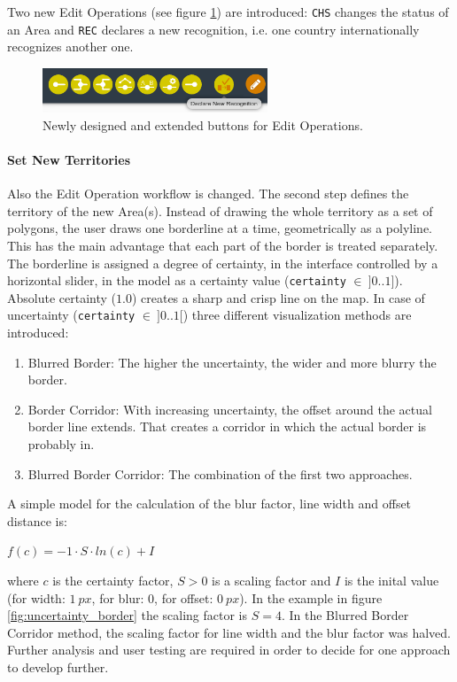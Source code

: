 Two new Edit Operations (see figure \ref{fig:edit_mode_extension}) are introduced: \texttt{CHS} changes the status of an Area and \texttt{REC} declares a new recognition, i.e. one country internationally recognizes another one.

\begin{figure}[ht]
  \centering
  \includegraphics[width = 0.6\textwidth]{graphics/extensions/edit_mode_extension.png}
  \caption{Newly designed and extended buttons for Edit Operations.}
  \label{fig:edit_mode_extension}
\end{figure}

\paragraph{Set New Territories} %
\label{par:set_new_territory}

Also the Edit Operation workflow is changed. The second step defines the territory of the new Area(s). Instead of drawing the whole territory as a set of polygons, the user draws one borderline at a time, geometrically as a polyline. This has the main advantage that each part of the border is treated separately. The borderline is assigned a degree of certainty, in the interface controlled by a horizontal slider, in the model as a certainty value (\texttt{certainty} $\in~]0 .. 1]$). Absolute certainty ($1.0$) creates a sharp and crisp line on the map. In case of uncertainty (\texttt{certainty} $\in~]0..1[$) three different visualization methods are introduced:

\begin{enumerate}
  \item Blurred Border: The higher the uncertainty, the wider and more blurry the border.
  \item Border Corridor: With increasing uncertainty, the offset around the actual border line extends. That creates a corridor in which the actual border is probably in.
  \item Blurred Border Corridor: The combination of the first two approaches.
\end{enumerate}

A simple model for the calculation of the blur factor, line width and offset distance is:
\begin{center}
\begin{math}
    f(c) = -1 \cdot S \cdot ln(c) + I
\end{math}
\end{center}
where $c$ is the certainty factor, $S>0$ is a scaling factor and $I$ is the inital value (for width: $1~px$, for blur: $0$, for offset: $0~px$). In the example in figure \ref{fig:uncertainty_border} the scaling factor is $S=4$. In the Blurred Border Corridor method, the scaling factor for line width and the blur factor was halved. Further analysis and user testing are required in order to decide for one approach to develop further.

